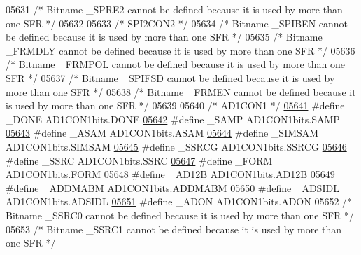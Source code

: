 \begin{DoxyCode}
05631 \textcolor{comment}{/* Bitname \_SPRE2 cannot be defined because it is used by more than one SFR */}
05632 
05633 \textcolor{comment}{/* SPI2CON2 */}
05634 \textcolor{comment}{/* Bitname \_SPIBEN cannot be defined because it is used by more than one SFR */}
05635 \textcolor{comment}{/* Bitname \_FRMDLY cannot be defined because it is used by more than one SFR */}
05636 \textcolor{comment}{/* Bitname \_FRMPOL cannot be defined because it is used by more than one SFR */}
05637 \textcolor{comment}{/* Bitname \_SPIFSD cannot be defined because it is used by more than one SFR */}
05638 \textcolor{comment}{/* Bitname \_FRMEN cannot be defined because it is used by more than one SFR */}
05639 
05640 \textcolor{comment}{/* AD1CON1 */}
\hypertarget{a00009_source_l05641}{}\hyperlink{a00009_a59027a8be1cbf4071522f0b3defff671}{05641} \textcolor{preprocessor}{#define \_DONE AD1CON1bits.DONE}
\hypertarget{a00009_source_l05642}{}\hyperlink{a00009_ace6b95b2efa8b10bc26d99ce74af8d43}{05642} \textcolor{preprocessor}{#define \_SAMP AD1CON1bits.SAMP}
\hypertarget{a00009_source_l05643}{}\hyperlink{a00009_a03bf5daffda68d7323469f42b3549f8d}{05643} \textcolor{preprocessor}{#define \_ASAM AD1CON1bits.ASAM}
\hypertarget{a00009_source_l05644}{}\hyperlink{a00009_ad30462ca02f3365802b0bfaf9ce984c6}{05644} \textcolor{preprocessor}{#define \_SIMSAM AD1CON1bits.SIMSAM}
\hypertarget{a00009_source_l05645}{}\hyperlink{a00009_adfe4c9e45983da35553d07b0b20197eb}{05645} \textcolor{preprocessor}{#define \_SSRCG AD1CON1bits.SSRCG}
\hypertarget{a00009_source_l05646}{}\hyperlink{a00009_a76852fd39427b719ac2bcd6d6ebdabe7}{05646} \textcolor{preprocessor}{#define \_SSRC AD1CON1bits.SSRC}
\hypertarget{a00009_source_l05647}{}\hyperlink{a00009_af84c42ef6f774748aa36923b7cf5ec6d}{05647} \textcolor{preprocessor}{#define \_FORM AD1CON1bits.FORM}
\hypertarget{a00009_source_l05648}{}\hyperlink{a00009_a31a937a168c877dfe17991a24677c110}{05648} \textcolor{preprocessor}{#define \_AD12B AD1CON1bits.AD12B}
\hypertarget{a00009_source_l05649}{}\hyperlink{a00009_aceb6b0e2b09a44b291ffdb11d160339c}{05649} \textcolor{preprocessor}{#define \_ADDMABM AD1CON1bits.ADDMABM}
\hypertarget{a00009_source_l05650}{}\hyperlink{a00009_a869498999d8135f2a76bd330a6f101fa}{05650} \textcolor{preprocessor}{#define \_ADSIDL AD1CON1bits.ADSIDL}
\hypertarget{a00009_source_l05651}{}\hyperlink{a00009_acc48d0a445aeca7183e433b8be518d27}{05651} \textcolor{preprocessor}{#define \_ADON AD1CON1bits.ADON}
05652 \textcolor{comment}{/* Bitname \_SSRC0 cannot be defined because it is used by more than one SFR */}
05653 \textcolor{comment}{/* Bitname \_SSRC1 cannot be defined because it is used by more than one SFR */}

\end{DoxyCode}
